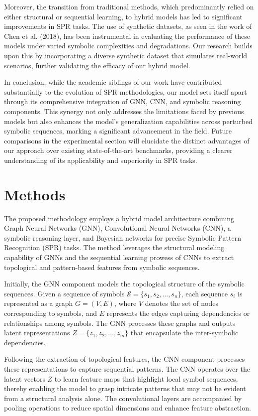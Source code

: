 \documentclass{article}
\begin{document}
Moreover, the transition from traditional methods, which predominantly relied on either structural or sequential learning, to hybrid models has led to significant improvements in SPR tasks. The use of synthetic datasets, as seen in the work of Chen et al. (2018), has been instrumental in evaluating the performance of these models under varied symbolic complexities and degradations. Our research builds upon this by incorporating a diverse synthetic dataset that simulates real-world scenarios, further validating the efficacy of our hybrid model.

In conclusion, while the academic siblings of our work have contributed substantially to the evolution of SPR methodologies, our model sets itself apart through its comprehensive integration of GNN, CNN, and symbolic reasoning components. This synergy not only addresses the limitations faced by previous models but also enhances the model’s generalization capabilities across perturbed symbolic sequences, marking a significant advancement in the field. Future comparisons in the experimental section will elucidate the distinct advantages of our approach over existing state-of-the-art benchmarks, providing a clearer understanding of its applicability and superiority in SPR tasks.

\section{Methods}
The proposed methodology employs a hybrid model architecture combining Graph Neural Networks (GNN), Convolutional Neural Networks (CNN), a symbolic reasoning layer, and Bayesian networks for precise Symbolic Pattern Recognition (SPR) tasks. The method leverages the structural modeling capability of GNNs and the sequential learning prowess of CNNs to extract topological and pattern-based features from symbolic sequences.

Initially, the GNN component models the topological structure of the symbolic sequences. Given a sequence of symbols \(\mathcal{S} = \{s_1, s_2, \ldots, s_n\}\), each sequence \(s_i\) is represented as a graph \(G = (V, E)\), where \(V\) denotes the set of nodes corresponding to symbols, and \(E\) represents the edges capturing dependencies or relationships among symbols. The GNN processes these graphs and outputs latent representations \(Z = \{z_1, z_2, \ldots, z_m\}\) that encapsulate the inter-symbolic dependencies.

Following the extraction of topological features, the CNN component processes these representations to capture sequential patterns. The CNN operates over the latent vectors \(Z\) to learn feature maps that highlight local symbol sequences, thereby enabling the model to grasp intricate patterns that may not be evident from a structural analysis alone. The convolutional layers are accompanied by pooling operations to reduce spatial dimensions and enhance feature abstraction.
\end{document}
